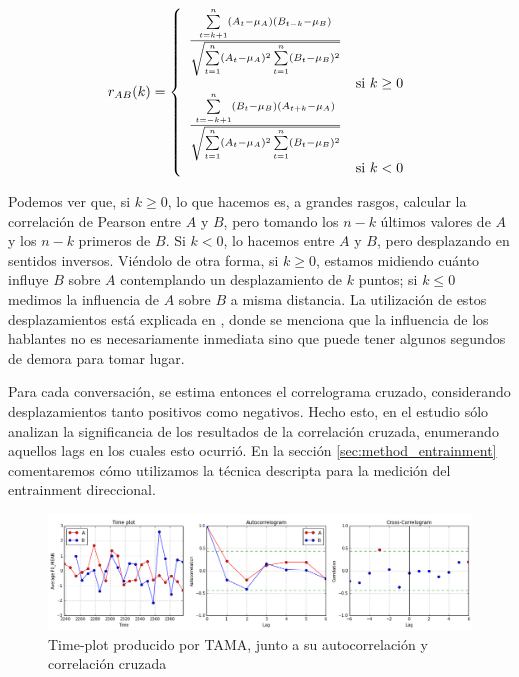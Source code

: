 \begin{equation}
  \label{cross_correlation_definition}
  r_{AB}(k) =
  \left\{
    \begin{array}{ll}
      \frac{\sum\limits_{t=k+1}^n (A_t - \mu_{A}) (B_{t-k} - \mu_{B})}{\sqrt{\sum\limits_{t=1}^n (A_t - \mu_{A})^2\sum\limits_{t=1}^n (B_t - \mu_{B})^2}} \\ & \mbox{si } k \geq 0 \\
      \frac{\sum\limits_{t=-k+1}^n (B_t - \mu_{B}) (A_{t+k} - \mu_{A})}{\sqrt{\sum\limits_{t=1}^n (A_t - \mu_{A})^2\sum\limits_{t=1}^n (B_t - \mu_{B})^2}} \\  & \mbox{si } k < 0
    \end{array}
  \right.
\end{equation}

Podemos ver que, si $k \geq 0$, lo que hacemos es, a grandes rasgos, calcular la correlación de Pearson entre $A$ y $B$, pero tomando los $n-k$ últimos valores de $A$ y los $n-k$ primeros de $B$. Si $k < 0$, lo hacemos entre $A$ y $B$, pero desplazando en sentidos inversos. Viéndolo de otra forma, si $k \geq 0$, estamos midiendo cuánto influye $B$ sobre $A$ contemplando un desplazamiento de $k$ puntos; si $k \leq 0$ medimos la influencia de $A$ sobre $B$ a misma distancia. La utilización de estos desplazamientos está explicada en \cite{gravano2015backward}, donde se menciona que la influencia de los hablantes no es necesariamente inmediata sino que puede tener algunos segundos de demora para tomar lugar. 

Para cada conversación, se estima entonces el correlograma cruzado, considerando desplazamientos tanto positivos como negativos. Hecho esto, en el estudio \cite{KOU2008.2} sólo analizan la significancia de los resultados de la correlación cruzada, enumerando aquellos lags en los cuales esto ocurrió. En la sección \ref{sec:method_entrainment} comentaremos cómo utilizamos la técnica descripta para la medición del entrainment direccional.

\begin{figure}[b]
\centering
\includegraphics[width=\textwidth]{images/time_plot_with_cross_correlation.png}
\caption{Time-plot producido por TAMA, junto a su autocorrelación y correlación cruzada}
\end{figure}


